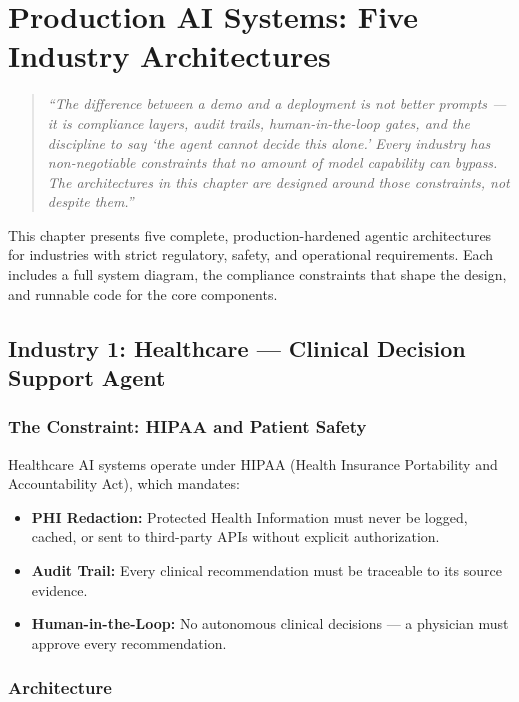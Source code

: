 \chapter{Production AI Systems: Five Industry Architectures}

\begin{quote}
\textit{``The difference between a demo and a deployment is not better prompts --- it is compliance layers, audit trails, human-in-the-loop gates, and the discipline to say `the agent cannot decide this alone.' Every industry has non-negotiable constraints that no amount of model capability can bypass. The architectures in this chapter are designed around those constraints, not despite them.''}
\end{quote}

This chapter presents five complete, production-hardened agentic architectures for industries with strict regulatory, safety, and operational requirements. Each includes a full system diagram, the compliance constraints that shape the design, and runnable code for the core components.

\section{Industry 1: Healthcare --- Clinical Decision Support Agent}

\subsection{The Constraint: HIPAA and Patient Safety}
Healthcare AI systems operate under HIPAA (Health Insurance Portability and Accountability Act), which mandates:
\begin{itemize}
    \item \textbf{PHI Redaction:} Protected Health Information must never be logged, cached, or sent to third-party APIs without explicit authorization.
    \item \textbf{Audit Trail:} Every clinical recommendation must be traceable to its source evidence.
    \item \textbf{Human-in-the-Loop:} No autonomous clinical decisions --- a physician must approve every recommendation.
\end{itemize}

\subsection{Architecture}

